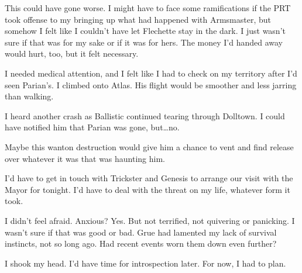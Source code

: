 This could have gone worse.  I might have to face some ramifications if the PRT took offense to my bringing up what had happened with Armsmaster, but somehow I felt like I couldn't have let Flechette stay in the dark.  I just wasn't sure if that was for my sake or if it was for hers.  The money I'd handed away would hurt, too, but it felt necessary.



I needed medical attention, and I felt like I had to check on my territory after I'd seen Parian's.  I climbed onto Atlas.  His flight would be smoother and less jarring than walking.



I heard another crash as Ballistic continued tearing through Dolltown.  I could have notified him that Parian was gone, but\ldots no.



Maybe this wanton destruction would give him a chance to vent and find release over whatever it was that was haunting him.



I'd have to get in touch with Trickster and Genesis to arrange our visit with the Mayor for tonight.  I'd have to deal with the threat on my life, whatever form it took.



I didn't feel afraid.  Anxious?  Yes.  But not terrified, not quivering or panicking.  I wasn't sure if that was good or bad.  Grue had lamented my lack of survival instincts, not so long ago.  Had recent events worn them down even further?



I shook my head.  I'd have time for introspection later.  For now, I had to plan.





